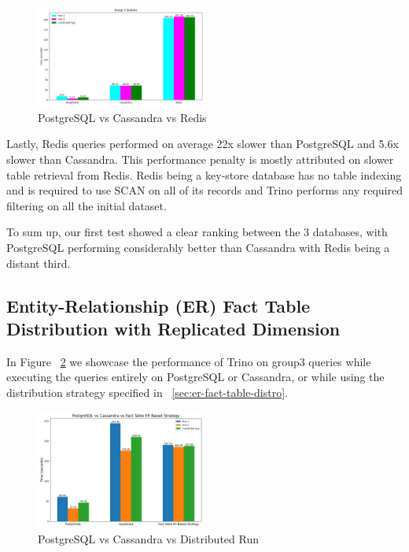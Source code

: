 \documentclass[conference]{IEEEtran}
\begin{document}
\begin{figure}[h]
	\centering
	\includegraphics[width=0.5\textwidth]{images/DBs_bench_no_distro/group3.png}
	\caption{PostgreSQL vs Cassandra vs Redis}
	\label{fig:psql-cass-redis-group3}
\end{figure}

Lastly, Redis queries performed on average 22x slower than PostgreSQL and 5.6x slower than Cassandra. This performance penalty is mostly attributed on slower table retrieval from Redis. Redis being a key-store database has no table indexing and is required to use SCAN on all of its records and Trino performs any required filtering on all the initial dataset.

To sum up, our first test showed a clear ranking between the 3 databases, with PostgreSQL performing considerably better than Cassandra with Redis being a distant third.

\subsection{Entity-Relationship (ER) Fact Table Distribution with
	Replicated Dimension}
\label{sec:distribution-based-on-fact-tables-er}

In Figure ~\ref{fig:psql-cass-distro} we showcase the performance of Trino on group3 queries while executing the queries entirely on PostgreSQL or Cassandra, or while using the distribution strategy specified in ~\ref{sec:er-fact-table-distro}.

\begin{figure}[h]
	\centering
	\includegraphics[width=0.5\textwidth]{images/No_distro_vs_dist1/no_dist_vs_dist1.png}
	\caption{PostgreSQL vs Cassandra vs Distributed Run}
	\label{fig:psql-cass-distro}
\end{figure}
\end{document}
